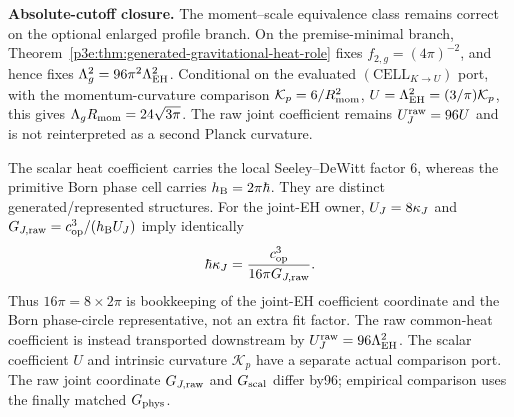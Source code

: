 \documentclass[12pt,a4paper]{article}
\begin{document}
\textbf{Absolute-cutoff closure.}
The moment--scale equivalence class remains correct on the optional enlarged
profile branch.  On the premise-minimal branch,
Theorem~\ref{p3e:thm:generated-gravitational-heat-role} fixes
\(f_{2,g}=(4\pi)^{-2}\), and hence fixes
\(\Lambda_g^2=96\pi^2\Lambda_{\rm EH}^2\).  Conditional on the evaluated $(\mathrm{CELL}_{K\to U})$ port, with the momentum-curvature
comparison \(\mathcal K_p=6/R_{\mathrm{mom}}^2\), \(U=\Lambda_{\rm EH}^2=(3/\pi)\mathcal K_p\), this gives
\(\Lambda_gR_{\mathrm{mom}}=24\sqrt{3\pi}\).  The raw joint coefficient remains
\(U_{J}^{\rm raw}=96U\) and is not reinterpreted as a second Planck
curvature.


\begin{remark}
The scalar heat coefficient carries the local Seeley--DeWitt factor \(6\),
whereas the primitive Born phase cell carries \(h_{\mathrm B}=2\pi\hbar\).  They are
distinct generated/represented structures.  For the joint-EH owner,
\(U_{J}=8\kappa_J\) and
\(G_{J,\rm raw}=c_{\rm op}^3/(h_{\mathrm B}U_{J})\) imply identically
\[
 \hbar\kappa_J=\frac{c_{\rm op}^3}{16\pi G_{J,\rm raw}}.
\]
Thus \(16\pi=8\times2\pi\) is bookkeeping of the joint-EH coefficient
coordinate and the Born phase-circle representative, not an extra fit factor.
The raw common-heat coefficient is instead transported downstream by
\(U_{J}^{\rm raw}=96\Lambda_{\rm EH}^2\).  The scalar coefficient $U$ and intrinsic curvature $\mathcal K_p$ have
a separate actual comparison port. The raw joint coordinate $G_{J,\rm raw}$
and $G_{\rm scal}$ differ by96; empirical comparison uses the finally
matched $G_{\rm phys}$.
\end{remark}
\end{document}
